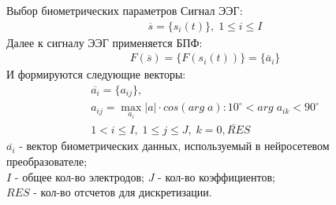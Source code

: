 \begin{frame}{Выбор биометрических параметров}
	Сигнал ЭЭГ:
	\begin{gather*}
		\overline{s} = \{ s_i(t) \},\; 1 \leq i \leq I
	\end{gather*}
	Далее к сигналу ЭЭГ применяется БПФ:
	\begin{gather*}
		F(\overline{s}) = \{ F(s_i(t)) \} = \{ \overline{a}_i \}
	\end{gather*}
	И формируются следующие векторы:
	\begin{gather*}
		\overline{a_i} = \{ a_{ij} \}, \\
		a_{ij} = \max_{a_i}|a| \cdot cos(arg \; a) : 10^{\circ} < arg \; a_{ik} < 90^{\circ} \\
		1 < i \leq I,\; 1 \leq j \leq J,\; k=\overline{0,RES}
	\end{gather*}
	$\overline{a_i}$ - вектор биометрических данных, используемый в нейросетевом преобразователе; \\
	$I$ - общее кол-во электродов; $J$ - кол-во коэффициентов; \\
	$RES$ - кол-во отсчетов для дискретизации.
\end{frame}
